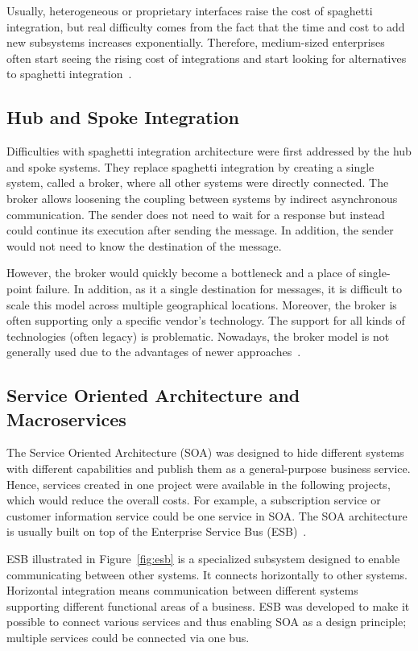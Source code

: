 \documentclass[english, 12pt, a4paper, sci, utf8, a-2b, online, obeyspaces]{aaltothesis}
\begin{document}
Usually, heterogeneous or proprietary interfaces raise the cost of spaghetti integration, but real difficulty comes from the fact that the time and cost to add new subsystems increases exponentially. Therefore, medium-sized enterprises often start seeing the rising cost of integrations and start looking for alternatives to spaghetti integration~\cite{josuttis2007soa}.

\subsection{Hub and Spoke Integration}
Difficulties with spaghetti integration architecture were first addressed by the hub and spoke systems. They replace spaghetti integration by creating a single system, called a broker, where all other systems were directly connected. The broker allows loosening the coupling between systems by indirect asynchronous communication. The sender does not need to wait for a response but instead could continue its execution after sending the message. In addition, the sender would not need to know the destination of the message.

However, the broker would quickly become a bottleneck and a place of single-point failure. In addition, as it a single destination for messages, it is difficult to scale this model across multiple geographical locations. Moreover, the broker is often supporting only a specific vendor’s technology. The support for all kinds of technologies (often legacy) is problematic. Nowadays, the broker model is not generally used due to the advantages of newer approaches~\cite{mulesoft2018understanding}.

\subsection{Service Oriented Architecture and Macroservices}
\label{sec:service_oriented_architecture_and_macroservices}
The Service Oriented Architecture (SOA) was designed to hide different systems with different capabilities and publish them as a general-purpose business service. Hence, services created in one project were available in the following projects, which would reduce the overall costs. For example, a subscription service or customer information service could be one service in SOA. The SOA architecture is usually built on top of the Enterprise Service Bus (ESB)~\cite{josuttis2007soa}.

ESB illustrated in Figure~\ref{fig:esb} is a specialized subsystem designed to enable communicating between other systems. It connects horizontally to other systems. Horizontal integration means communication between different systems supporting different functional areas of a business. ESB was developed to make it possible to connect various services and thus enabling SOA as a design principle; multiple services could be connected via one bus.
\end{document}
